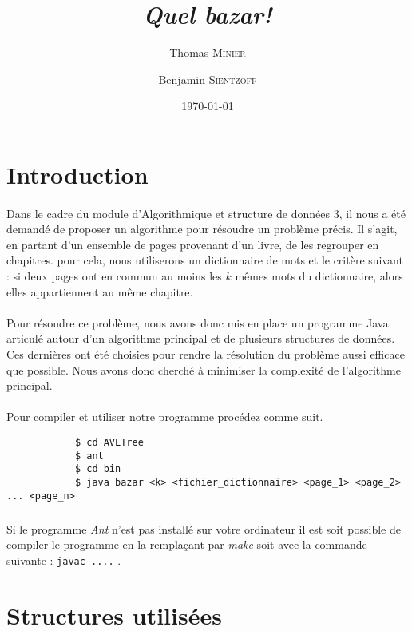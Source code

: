 \documentclass[a4paper]{article}
\title{\textit{Quel bazar!}}
\author{Thomas \textsc{Minier} \and Benjamin \textsc{Sientzoff}}
\date{\today}
\begin{document}
	\maketitle
	\vspace{5cm}
	\tableofcontents
	\newpage %
	
	\section*{Introduction}

		\paragraph{}{
		Dans le cadre du module d'Algorithmique et structure de données 3, il nous a été demandé de proposer un algorithme pour résoudre un problème précis. Il s'agit, en partant d'un ensemble de pages provenant d'un livre, de les regrouper en chapitres. pour cela, nous utiliserons un dictionnaire de mots et le critère suivant : si deux pages ont en commun au moins les $k$ mêmes mots du dictionnaire, alors elles appartiennent au même chapitre.
		}
		
		\paragraph{}{
		Pour résoudre ce problème, nous avons donc mis en place un programme Java articulé autour d'un algorithme principal et de plusieurs structures de données. Ces dernières ont été choisies pour rendre la résolution du problème aussi efficace que possible. Nous avons donc cherché à minimiser la complexité de l'algorithme principal.
		}
		
		\paragraph{}{
		Pour compiler et utiliser notre programme procédez comme suit.
		\begin{verbatim}
			$ cd AVLTree
			$ ant
			$ cd bin
			$ java bazar <k> <fichier_dictionnaire> <page_1> <page_2> ... <page_n>
		\end{verbatim}
		}
		
		\subparagraph{}{
		Si le programme \textit{Ant} n'est pas installé sur votre ordinateur il est soit possible de compiler le programme en la remplaçant par \textit{make} soit avec la commande suivante : \verb|javac ....| .
		}
		
		
	\section{Structures utilisées}
	
\end{document}
